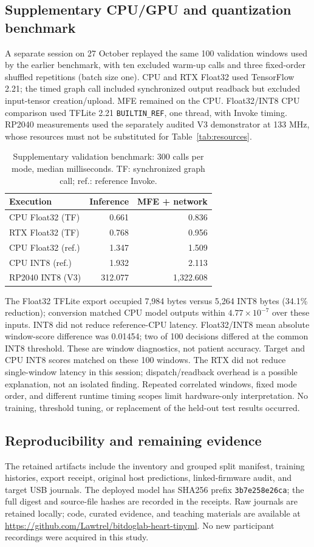 \documentclass[9pt,twocolumn,twoside,lineno]{MSBJournal}
\begin{document}
\subsection{Supplementary CPU/GPU and quantization benchmark}
A separate session on 27 October replayed the same 100 validation windows used by the earlier benchmark, with ten excluded warm-up calls and three fixed-order shuffled repetitions (batch size one). CPU and RTX Float32 used TensorFlow 2.21; the timed graph call included synchronized output readback but excluded input-tensor creation/upload. MFE remained on the CPU. Float32/INT8 CPU comparison used TFLite 2.21 \texttt{BUILTIN\_REF}, one thread, with Invoke timing. RP2040 measurements used the separately audited V3 demonstrator at 133 MHz, whose resources must not be substituted for Table~\ref{tab:resources}.
\begin{table}[t]\centering
\caption{Supplementary validation benchmark: 300 calls per mode, median milliseconds. TF: synchronized graph call; ref.: reference Invoke.}\label{tab:fresh}
\begin{tabular}{lrr}\toprule
Execution & Inference & MFE + network\\\midrule
CPU Float32 (TF) & 0.661 & 0.836\\
RTX Float32 (TF) & 0.768 & 0.956\\
CPU Float32 (ref.) & 1.347 & 1.509\\
CPU INT8 (ref.) & 1.932 & 2.113\\
RP2040 INT8 (V3) & 312.077 & 1,322.608\\\bottomrule
\end{tabular}\end{table}
The Float32 TFLite export occupied 7,984 bytes versus 5,264 INT8 bytes (34.1\% reduction); conversion matched CPU model outputs within $4.77\times10^{-7}$ over these inputs. INT8 did not reduce reference-CPU latency. Float32/INT8 mean absolute window-score difference was 0.01454; two of 100 decisions differed at the common INT8 threshold. These are window diagnostics, not patient accuracy. Target and CPU INT8 scores matched on these 100 windows. The RTX did not reduce single-window latency in this session; dispatch/readback overhead is a possible explanation, not an isolated finding. Repeated correlated windows, fixed mode order, and different runtime timing scopes limit hardware-only interpretation. No training, threshold tuning, or replacement of the held-out test results occurred.

\subsection{Reproducibility and remaining evidence}
The retained artifacts include the inventory and grouped split manifest, training histories, export receipt, original host predictions, linked-firmware audit, and target USB journals. The deployed model has SHA256 prefix \texttt{3b7e258e26ca}; the full digest and source-file hashes are recorded in the receipts. Raw journals are retained locally; code, curated evidence, and teaching materials are available at \url{https://github.com/Lawtrel/bitdoglab-heart-tinyml}. No new participant recordings were acquired in this study.
\end{document}
